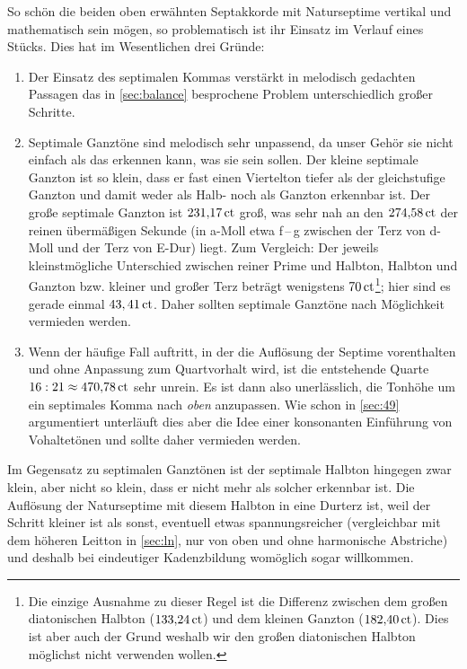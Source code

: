 So schön die beiden oben erwähnten Septakkorde mit Naturseptime vertikal und
mathematisch sein mögen, so problematisch ist ihr Einsatz im Verlauf eines
Stücks. Dies hat im Wesentlichen drei Gründe:
\begin{enumerate}
\item Der Einsatz des septimalen Kommas verstärkt in melodisch gedachten
  Passagen das in \cref{sec:balance} besprochene Problem unterschiedlich großer
  Schritte.
\item Septimale Ganztöne sind melodisch sehr unpassend, da unser Gehör sie nicht
  einfach als das erkennen kann, was sie sein sollen. Der kleine septimale
  Ganzton ist so klein, dass er fast einen Viertelton tiefer als der
  gleichstufige Ganzton und damit weder als Halb- noch als Ganzton erkennbar
  ist. Der große septimale Ganzton ist $231{,}17\,\text{ct}$ groß, was sehr nah an den
  $274{,}58\,\text{ct}$ der reinen übermäßigen Sekunde (in a-Moll etwa \naturalp
  f\,–\,\sharpm g zwischen der Terz von d-Moll und der Terz von E-Dur)
  liegt. Zum Vergleich: Der jeweils kleinstmögliche Unterschied zwischen reiner
  Prime und Halbton, Halbton und Ganzton bzw. kleiner und großer Terz beträgt
  wenigstens $70\,\text{ct}$\footnote{Die einzige Ausnahme zu dieser Regel ist die
    Differenz zwischen dem großen diatonischen Halbton ($133{,}24\,\text{ct}$) und dem
    kleinen Ganzton ($182{,}40\,\text{ct}$). Dies ist aber auch der Grund weshalb wir
    den großen diatonischen Halbton möglichst nicht verwenden wollen.}; hier
  sind es gerade einmal $43,41\,\text{ct}$.  Daher sollten septimale Ganztöne nach
  Möglichkeit vermieden werden.
\item Wenn der häufige Fall auftritt, in der die Auflösung der Septime
  vorenthalten und ohne Anpassung zum Quartvorhalt wird, ist die entstehende
  Quarte $16:21 \approx 470{,}78\,\text{ct}$ sehr unrein.  Es ist dann also
  unerlässlich, die Tonhöhe um ein septimales Komma nach \emph{oben}
  anzupassen. Wie schon in \cref{sec:49} argumentiert unterläuft dies aber die
  Idee einer konsonanten Einführung von Vohaltetönen und sollte daher vermieden
  werden.
\end{enumerate}
Im Gegensatz zu septimalen Ganztönen ist der septimale Halbton hingegen zwar
klein, aber nicht so klein, dass er nicht mehr als solcher erkennbar ist. Die
Auflösung der Naturseptime mit diesem Halbton in eine Durterz ist, weil der
Schritt kleiner ist als sonst, eventuell etwas spannungsreicher (vergleichbar
mit dem höheren Leitton in \cref{sec:ln}, nur von oben und ohne harmonische
Abstriche) und deshalb bei eindeutiger Kadenzbildung womöglich sogar willkommen.

